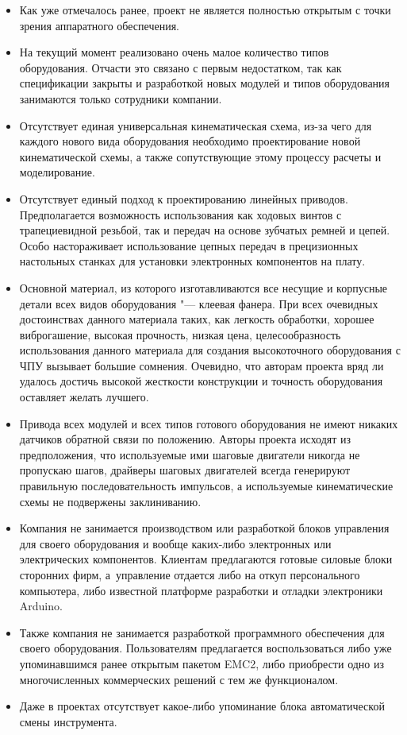 \begin{itemize}
	\item Как уже отмечалось ранее, проект не является полностью открытым с точки зрения аппаратного обеспечения.
	\item На текущий момент реализовано очень малое количество типов оборудования. Отчасти это связано с первым недостатком, так как спецификации закрыты и разработкой новых модулей и типов оборудования занимаются только сотрудники компании.
	\item Отсутствует единая универсальная кинематическая схема, из-за чего для каждого нового вида оборудования необходимо проектирование новой кинематической схемы, а также сопутствующие этому процессу расчеты и моделирование.
	\item Отсутствует единый подход к проектированию линейных приводов. Предполагается возможность использования как ходовых винтов с трапециевидной резьбой, так и передач на основе зубчатых ремней и цепей. Особо настораживает использование цепных передач в прецизионных настольных станках для установки электронных компонентов на плату.
	\item Основной материал, из которого изготавливаются все несущие и корпусные детали всех видов оборудования "--- клеевая фанера. При всех очевидных достоинствах данного материала таких, как легкость обработки, хорошее виброгашение, высокая прочность, низкая цена, целесообразность использования данного материала для создания высокоточного оборудования с ЧПУ вызывает большие сомнения. Очевидно, что авторам проекта вряд ли удалось достичь высокой жесткости конструкции и точность оборудования оставляет желать лучшего.
	\item Привода всех модулей и всех типов готового оборудования не имеют никаких датчиков обратной связи по положению. Авторы проекта исходят из предположения, что используемые ими шаговые двигатели никогда не пропускаю шагов, драйверы шаговых двигателей всегда генерируют правильную последовательность импульсов, а используемые кинематические схемы не подвержены заклиниванию.
	\item Компания не занимается производством или разработкой блоков управления для своего оборудования и вообще каких-либо электронных или электрических компонентов. Клиентам предлагаются готовые силовые блоки сторонних фирм, а~управление отдается либо на откуп персонального компьютера, либо известной платформе разработки и отладки электроники Arduino.
	\item Также компания не занимается разработкой программного обеспечения для своего оборудования. Пользователям предлагается воспользоваться либо уже упоминавшимся ранее открытым пакетом EMC2, либо приобрести одно из многочисленных коммерческих решений с тем же функционалом.
	\item Даже в проектах отсутствует какое-либо упоминание блока автоматической смены инструмента.
\end{itemize}

